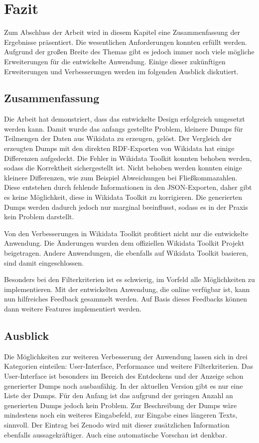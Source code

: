 \chapter{Fazit}
\label{chap:conclusion}
Zum Abschluss der Arbeit wird in diesem Kapitel eine Zusammenfassung der Ergebnisse präsentiert.
Die wesentlichen Anforderungen konnten erfüllt werden.
Aufgrund der großen Breite des Themas gibt es jedoch immer noch viele mögliche Erweiterungen für die entwickelte Anwendung.
Einige dieser zukünftigen Erweiterungen und Verbesserungen werden im folgenden Ausblick diskutiert.

\section{Zusammenfassung}
Die Arbeit hat demonstriert, dass das entwickelte Design erfolgreich umgesetzt werden kann.
Damit wurde das anfangs gestellte Problem, kleinere Dumps für Teilmengen der Daten aus Wikidata zu erzeugen, gelöst.
Der Vergleich der erzeugten Dumps mit den direkten RDF-Exporten von Wikidata hat einige Differenzen aufgedeckt.
Die Fehler in Wikidata Toolkit konnten behoben werden, sodass die Korrektheit sichergestellt ist.
Nicht behoben werden konnten einige kleinere Differenzen, wie zum Beispiel Abweichungen bei Fließkommazahlen.
Diese entstehen durch fehlende Informationen in den JSON-Exporten, daher gibt es keine Möglichkeit, diese in Wikidata Toolkit zu korrigieren.
Die generierten Dumps werden dadurch jedoch nur marginal beeinflusst, sodass es in der Praxis kein Problem darstellt.

Von den Verbesserungen in Wikidata Toolkit profitiert nicht nur die entwickelte Anwendung.
Die Änderungen wurden dem offiziellen Wikidata Toolkit Projekt beigetragen.
Andere Anwendungen, die ebenfalls auf Wikidata Toolkit basieren, sind damit eingeschlossen.

Besonders bei den Filterkriterien ist es schwierig, im Vorfeld alle Möglichkeiten zu implementieren.
Mit der entwickelten Anwendung, die online verfügbar ist, kann nun hilfreiches Feedback gesammelt werden.
Auf Basis dieses Feedbacks können dann weitere Features implementiert werden.

\section{Ausblick} 
Die Möglichkeiten zur weiteren Verbesserung der Anwendung lassen sich in drei Kategorien einteilen: User-Interface, Performance und weitere Filterkriterien.
Das User-Interface ist besonders im Bereich des Entdeckens und der Anzeige schon generierter Dumps noch ausbaufähig.
In der aktuellen Version gibt es nur eine Liste der Dumps. 
Für den Anfang ist das aufgrund der geringen Anzahl an generierten Dumps jedoch kein Problem.
Zur Beschreibung der Dumps wäre mindestens noch ein weiteres Eingabefeld, zur Eingabe eines längeren Texts, sinnvoll.
Der Eintrag bei Zenodo wird mit dieser zusätzlichen Information ebenfalls aussagekräftiger.
Auch eine automatische Vorschau ist denkbar.

